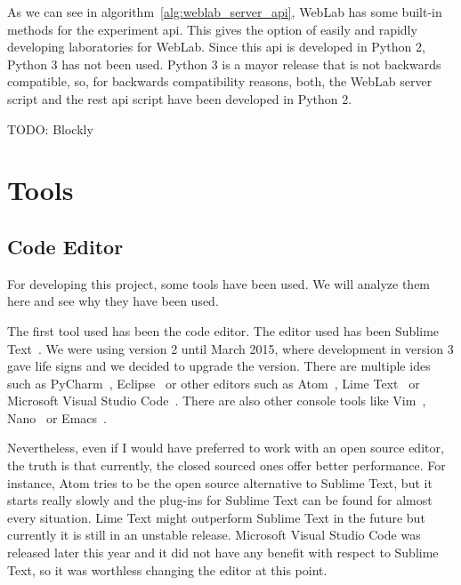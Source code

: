 As we can see in algorithm~\ref{alg:weblab_server_api}, WebLab has some built-in methods for the
experiment \acrshort{api}. This gives the option of easily and rapidly developing laboratories for
WebLab. Since this \acrshort{api} is developed in Python 2, Python 3 has not been used. Python 3 is
a mayor release that is not backwards compatible, so, for backwards compatibility reasons, both, the
WebLab server script and the \acrshort{rest} \acrshort{api} script have been developed in Python 2.

TODO: Blockly

\section{Tools}

\subsection{Code Editor}

For developing this project, some tools have been used. We will analyze them here and see why they
have been used.

The first tool used has been the code editor. The editor used has been Sublime
Text~\cite{sublime_web}. We were using version 2 until March 2015, where development in version 3
gave life signs and we decided to upgrade the version. There are multiple \acrshort{ide}s such as
PyCharm~\cite{pycharm_web}, Eclipse~\cite{eclipse_web} or other editors such as
Atom~\cite{atom_web}, Lime Text~\cite{lime_web} or Microsoft Visual Studio Code~\cite{ms_code_web}.
There are also other console tools like Vim~\cite{vim_web}, Nano~\cite{nano_web} or
Emacs~\cite{emacs_web}.

Nevertheless, even if I would have preferred to work with an open source editor, the truth is that
currently, the closed sourced ones offer better performance. For instance, Atom tries to be the
open source alternative to Sublime Text, but it starts really slowly and the plug-ins for Sublime
Text can be found for almost every situation. Lime Text might outperform Sublime Text in the future
but currently it is still in an unstable release. Microsoft Visual Studio Code was released later
this year and it did not have any benefit with respect to Sublime Text, so it was worthless changing
the editor at this point.

